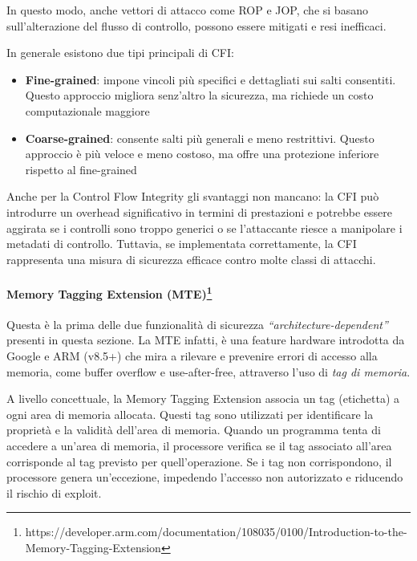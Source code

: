 In questo modo, anche vettori di attacco come ROP e JOP, che si basano sull'alterazione
del flusso di controllo, possono essere mitigati e resi inefficaci.

In generale esistono due tipi principali di CFI:
\begin{itemize}
  \item \textbf{Fine-grained}: impone vincoli più specifici e dettagliati sui salti
    consentiti. Questo approccio migliora senz'altro la sicurezza, ma richiede un
    costo computazionale maggiore

  \item \textbf{Coarse-grained}: consente salti più generali e meno restrittivi.
    Questo approccio è più veloce e meno costoso, ma offre una protezione inferiore
    rispetto al fine-grained
\end{itemize}

Anche per la Control Flow Integrity gli svantaggi non mancano: la CFI può
introdurre un overhead significativo in termini di prestazioni e potrebbe essere
aggirata se i controlli sono troppo generici o se l'attaccante riesce a
manipolare i metadati di controllo. Tuttavia, se implementata correttamente, la CFI
rappresenta una misura di sicurezza efficace contro molte classi di attacchi.~\cite{control_flow_integrity}

\paragraph{Memory Tagging Extension (MTE)\protect\footnote{https://developer.arm.com/documentation/108035/0100/Introduction-to-the-Memory-Tagging-Extension}}
Questa è la prima delle due funzionalità di sicurezza \textit{``architecture-dependent''}
presenti in questa sezione. La MTE infatti, è una feature hardware introdotta da
Google e ARM (v8.5+) che mira a rilevare e prevenire errori di accesso alla memoria,
come buffer overflow e use-after-free, attraverso l'uso di \textit{tag di
memoria}.

A livello concettuale, la Memory Tagging Extension associa un tag (etichetta) a ogni
area di memoria allocata. Questi tag sono utilizzati per identificare la
proprietà e la validità dell'area di memoria. Quando un programma tenta di accedere
a un'area di memoria, il processore verifica se il tag associato all'area
corrisponde al tag previsto per quell'operazione. Se i tag non corrispondono, il
processore genera un'eccezione, impedendo l'accesso non autorizzato e riducendo il
rischio di exploit.


